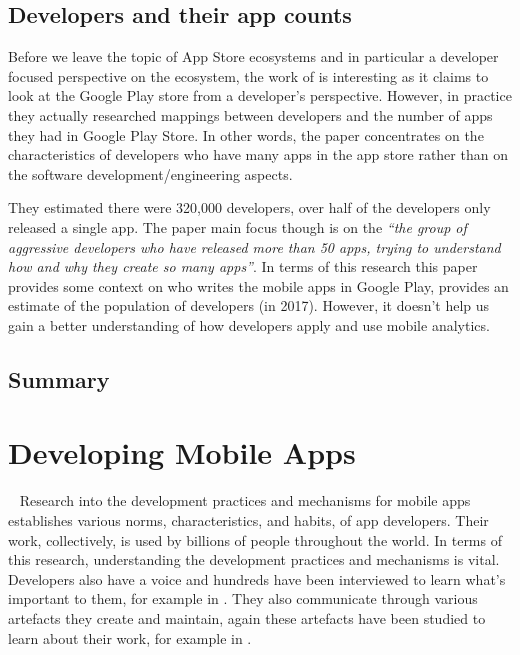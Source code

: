 \subsection{Developers and their app counts}
Before we leave the topic of App Store ecosystems and in particular a developer focused perspective on the ecosystem, the work of \textcite{wang2017_exploratory_study_of_the_mobile_app_ecosystem} is interesting as it claims to look at the Google Play store from a developer's perspective. However, in practice they actually researched mappings between developers and the number of apps they had in Google Play Store. In other words, the paper concentrates on the characteristics of developers who have many apps in the app store rather than on the software development/engineering aspects.

They estimated there were 320,000 developers, over half of the developers only released a single app. The paper main focus though is on the \emph{``the group of aggressive developers who have released more than 50 apps, trying to understand how and why they create so many apps''}. In terms of this research this paper provides some context on who writes the mobile apps in Google Play, provides an estimate of the population of developers (in 2017). However, it doesn't help us gain a better understanding of how developers apply and use mobile analytics.

\subsection{Summary} %

\section{Developing Mobile Apps}~\label{rw-developing-mobile-apps-section}
Research into the development practices and mechanisms for mobile apps establishes various norms, characteristics, and habits, of app developers. Their work, collectively, is used by billions of people throughout the world. In terms of this research, understanding the development practices and mechanisms is vital. Developers also have a voice and hundreds have been interviewed to learn what's important to them, for example in . They also communicate through various artefacts they create and maintain, again these artefacts have been studied to learn about their work, for example in .

